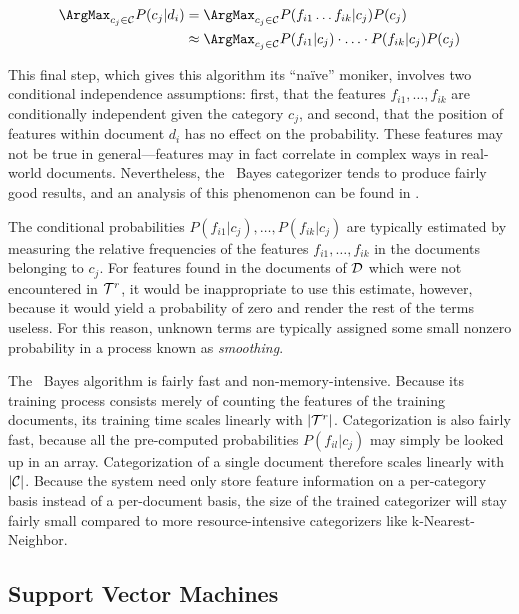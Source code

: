\begin{align*}
\ArgMax_{c_j\in\cats} P(c_j|d_i) 
 & = \ArgMax_{c_j\in\cats} P(f_{i1} \ldots f_{ik}|c_j) P(c_j) \\
 & \approx \ArgMax_{c_j\in\cats} P(f_{i1}|c_j) \cdot \ldots \cdot P(f_{ik}|c_j) P(c_j) \\
\end{align*}

This final step, which gives this algorithm its ``na\"ive'' moniker,
involves two conditional independence assumptions: first, that the
features $f_{i1}, \ldots, f_{ik}$ are conditionally independent given
the category $c_j$, and second, that the position of features within
document $d_i$ has no effect on the probability.  These features may
not be true in general---features may in fact correlate in complex
ways in real-world documents.  Nevertheless, the \naive\ Bayes
categorizer tends to produce fairly good results, and an analysis of
this phenomenon can be found in \cite{domingos:97}.

The conditional probabilities $P(f_{i1}|c_j), \ldots, P(f_{ik}|c_j)$
are typically estimated by measuring the relative frequencies of the
features $f_{i1}, \ldots, f_{ik}$ in the documents belonging to
$c_j$.  For features found in the documents of $\mathcal{D}$ which were not
encountered in $\mathcal{T}^r$, it would be inappropriate to use this
estimate, however, because it would yield a probability of zero and
render the rest of the terms useless.  For this reason, unknown terms
are typically assigned some small nonzero probability in a process
known as \emph{smoothing}.

The \naive\ Bayes algorithm is fairly fast and non-memory-intensive.
Because its training process consists merely of counting the features
of the training documents, its training time scales linearly with
$|\mathcal{T}^r|$.  Categorization is also fairly fast, because all the
pre-computed probabilities $P(f_{il}|c_j)$ may simply be looked up in
an array.  Categorization of a single document therefore scales
linearly with $|\mathcal{C}|$.  Because the system need only store feature
information on a per-category basis instead of a per-document basis,
the size of the trained categorizer will stay fairly small compared to
more resource-intensive categorizers like k-Nearest-Neighbor.

\subsection{Support Vector Machines}

